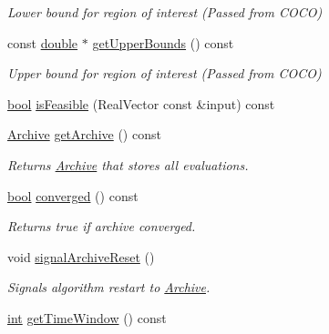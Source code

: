 \begin{DoxyCompactItemize}
\begin{DoxyCompactList}\small\item\em Lower bound for region of interest (Passed from C\+O\+CO) \end{DoxyCompactList}\item 
const \hyperlink{classdouble}{double} $\ast$ \hyperlink{classCOCOfunc_a04a3839722b0bd6ef34b7391d1c63101}{get\+Upper\+Bounds} () const\hypertarget{classCOCOfunc_a04a3839722b0bd6ef34b7391d1c63101}{}\label{classCOCOfunc_a04a3839722b0bd6ef34b7391d1c63101}

\begin{DoxyCompactList}\small\item\em Upper bound for region of interest (Passed from C\+O\+CO) \end{DoxyCompactList}\item 
\hyperlink{classbool}{bool} \hyperlink{classCOCOfunc_a81ffc0c8318e3f2163237f6329dfd621}{is\+Feasible} (Real\+Vector const \&input) const
\item 
\hyperlink{classArchive}{Archive} \hyperlink{classCOCOfunc_aa0ed7f73c9689c5beceb67452494842e}{get\+Archive} () const\hypertarget{classCOCOfunc_aa0ed7f73c9689c5beceb67452494842e}{}\label{classCOCOfunc_aa0ed7f73c9689c5beceb67452494842e}

\begin{DoxyCompactList}\small\item\em Returns \hyperlink{classArchive}{Archive} that stores all evaluations. \end{DoxyCompactList}\item 
\hyperlink{classbool}{bool} \hyperlink{classCOCOfunc_a439fbb980cddaa9ffa900177f14c90e3}{converged} () const\hypertarget{classCOCOfunc_a439fbb980cddaa9ffa900177f14c90e3}{}\label{classCOCOfunc_a439fbb980cddaa9ffa900177f14c90e3}

\begin{DoxyCompactList}\small\item\em Returns true if archive converged. \end{DoxyCompactList}\item 
void \hyperlink{classCOCOfunc_aa05f6328202055ad1775bfc702138d57}{signal\+Archive\+Reset} ()\hypertarget{classCOCOfunc_aa05f6328202055ad1775bfc702138d57}{}\label{classCOCOfunc_aa05f6328202055ad1775bfc702138d57}

\begin{DoxyCompactList}\small\item\em Signals algorithm restart to \hyperlink{classArchive}{Archive}. \end{DoxyCompactList}\item 
\hyperlink{classint}{int} \hyperlink{classCOCOfunc_a564ba29a6578acbf448b6d4637dba5e6}{get\+Time\+Window} () const\hypertarget{classCOCOfunc_a564ba29a6578acbf448b6d4637dba5e6}{}\label{classCOCOfunc_a564ba29a6578acbf448b6d4637dba5e6}


\end{DoxyCompactItemize}
